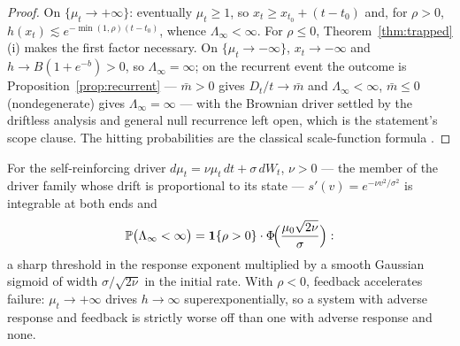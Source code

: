 
\begin{proof}
On $\{\mu_t\to+\infty\}$: eventually $\mu_t\ge1$, so
$x_t\ge x_{t_0}+(t-t_0)$ and, for $\rho>0$,
$h(x_t)\lesssim e^{-\min(1,\rho)(t-t_0)}$, whence
$\Lambda_\infty<\infty$. For $\rho\le0$,
Theorem~\ref{thm:trapped}(i) makes the first factor necessary. On
$\{\mu_t\to-\infty\}$, $x_t\to-\infty$ and
$h\to B(1+e^{-b})>0$, so $\Lambda_\infty=\infty$; on the recurrent
event the outcome is Proposition~\ref{prop:recurrent} ---
$\bar m>0$ gives $D_t/t\to\bar m$ and $\Lambda_\infty<\infty$,
$\bar m\le0$ (nondegenerate) gives $\Lambda_\infty=\infty$ --- with
the Brownian driver settled by the driftless analysis and general
null recurrence left open, which is the statement's scope clause.
The hitting probabilities are the classical scale-function formula
\cite{KT81,RY99}.
\end{proof}

\begin{corollary}\label{cor:solvable}
For the self-reinforcing driver $d\mu_t=\nu\mu_t\,dt+\sigma\,dW_t$,
$\nu>0$ --- the member of the driver family whose drift is
proportional to its state ---
$s'(v)=e^{-\nu v^2/\sigma^2}$ is integrable at both ends and
\begin{equation}\label{eq:sigmoid}
\mathbb{P}\bigl(\Lambda_\infty<\infty\bigr)
=\mathbf{1}\{\rho>0\}\cdot\Phi\!\Bigl(\frac{\mu_0\sqrt{2\nu}}{\sigma}\Bigr):
\end{equation}
a sharp threshold in the response exponent multiplied by a smooth
Gaussian sigmoid of width $\sigma/\sqrt{2\nu}$ in the initial rate.
With $\rho<0$, feedback accelerates failure:
$\mu_t\to+\infty$ drives $h\to\infty$ superexponentially, so a system
with adverse response and feedback is strictly worse off than one with
adverse response and none.
\end{corollary}

